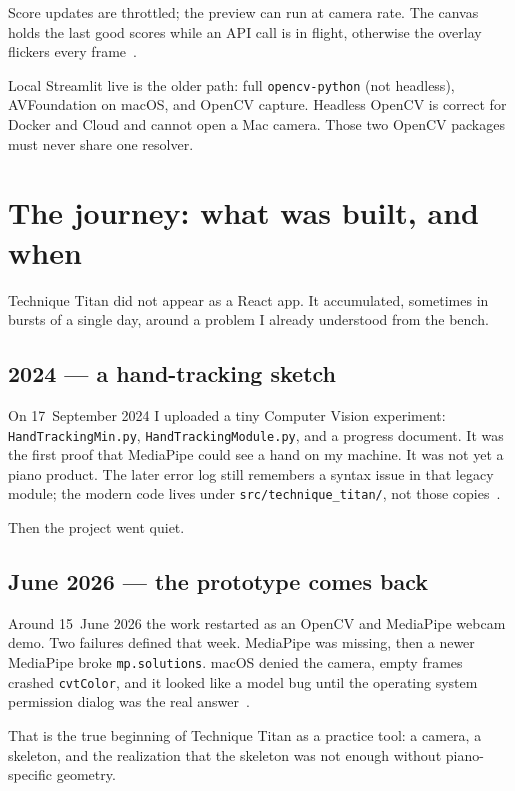 \documentclass[11pt,a4paper]{article}
\newcommand{\code}[1]{\texttt{#1}}
\begin{document}
Score updates are throttled; the preview can run at camera rate.
The canvas holds the last good scores while an API call is in flight, otherwise the overlay flickers every frame~\cite{errors}.

Local Streamlit live is the older path: full \code{opencv-python} (not headless), AVFoundation on macOS, and OpenCV capture.
Headless OpenCV is correct for Docker and Cloud and cannot open a Mac camera.
Those two OpenCV packages must never share one resolver.

\section{The journey: what was built, and when}
\label{sec:timeline}

Technique Titan did not appear as a React app.
It accumulated, sometimes in bursts of a single day, around a problem I already understood from the bench.

\subsection{2024 --- a hand-tracking sketch}

On 17~September 2024 I uploaded a tiny Computer Vision experiment: \code{HandTrackingMin.py}, \code{HandTrackingModule.py}, and a progress document.
It was the first proof that MediaPipe could see a hand on my machine.
It was not yet a piano product.
The later error log still remembers a syntax issue in that legacy module; the modern code lives under \code{src/technique\_titan/}, not those copies~\cite{errors}.

Then the project went quiet.

\subsection{June 2026 --- the prototype comes back}

Around 15~June 2026 the work restarted as an OpenCV and MediaPipe webcam demo.
Two failures defined that week.
MediaPipe was missing, then a newer MediaPipe broke \code{mp.solutions}.
macOS denied the camera, empty frames crashed \code{cvtColor}, and it looked like a model bug until the operating system permission dialog was the real answer~\cite{errors}.

That is the true beginning of Technique Titan as a practice tool: a camera, a skeleton, and the realization that the skeleton was not enough without piano-specific geometry.
\end{document}
